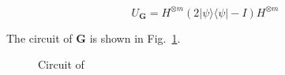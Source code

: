 
\begin{equation} \label{equ:U_G}
U_\mathbf{G} = H^{\otimes m}(2|\psi\rangle\langle \psi|- I)H^{\otimes m}
\end{equation}

The circuit of $\mathbf{G}$ is shown in Fig.~\ref{fig:g-operator}.

\begin{figure}[htp]
  \centering
  \caption{Circuit of }
  \label{fig:g-operator}
\end{figure}
